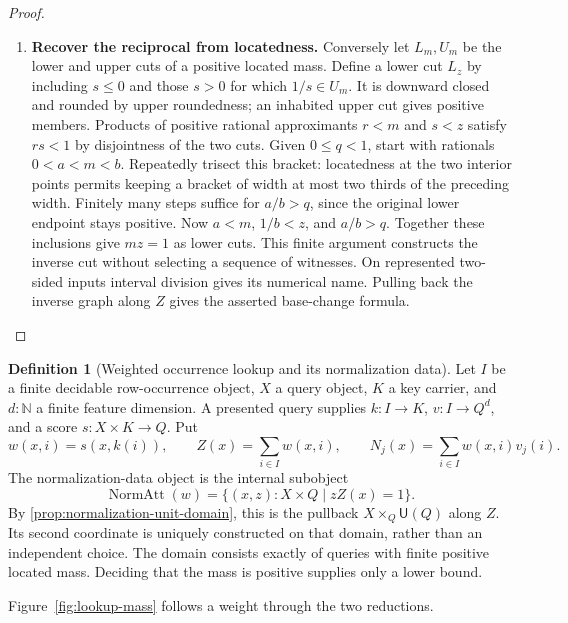 \documentclass[11pt,a4paper]{article}
\theoremstyle{definition}
\newtheorem{definition}[definition]{Definition}
\theoremstyle{remark}\newaliascnt{remark}{theorem}
\newcommand{\N}{\mathbb N}
\numberwithin{equation}{section}
\begin{document}
\begin{proof}
\begin{enumerate}[titledsteps]
    \item \textbf{Recover the reciprocal from locatedness.} Conversely let $L_m,U_m$ be the lower and upper cuts of a positive located mass. Define a lower cut $L_z$ by including $s\le0$ and those $s>0$ for which $1/s\in U_m$. It is downward closed and rounded by upper roundedness; an inhabited upper cut gives positive members. Products of positive rational approximants $r<m$ and $s<z$ satisfy $rs<1$ by disjointness of the two cuts. Given $0\le q<1$, start with rationals $0<a<m<b$. Repeatedly trisect this bracket: locatedness at the two interior points permits keeping a bracket of width at most two thirds of the preceding width. Finitely many steps suffice for $a/b>q$, since the original lower endpoint stays positive. Now $a<m$, $1/b<z$, and $a/b>q$. Together these inclusions give $mz=1$ as lower cuts. This finite argument constructs the inverse cut without selecting a sequence of witnesses. On represented two-sided inputs interval division gives its numerical name. Pulling back the inverse graph along $Z$ gives the asserted base-change formula.\qedhere
\end{enumerate}
\end{proof}
\begin{definition}[Weighted occurrence lookup and its normalization data]
\label{def:quant-attention}
Let $I$ be a finite decidable row-occurrence object, $X$ a query object,
$K$ a key carrier, and $d:\N$ a finite feature dimension. A presented
query supplies $k:I\to K$, $v:I\to Q^d$, and a score
$s:X\times K\to Q$. Put
\begin{equation}\label{eq:attention-raw}
 w(x,i)=s(x,k(i)),\qquad Z(x)=\sum_{i\in I}w(x,i),\qquad
 N_j(x)=\sum_{i\in I}w(x,i)v_j(i).
\end{equation}
The normalization-data object is the internal subobject
\begin{equation}\label{eq:attention-domain}
 \operatorname{NormAtt}(w)=
 \{(x,z):X\times Q\mid zZ(x)=1\}.
\end{equation}
By \cref{prop:normalization-unit-domain}, this is the pullback
$X\times_Q\mathsf{U}(Q)$ along $Z$. Its second coordinate is
uniquely constructed on that domain, rather than an independent
choice. The domain consists exactly of queries with finite positive
located mass. Deciding that the mass is positive supplies only a lower bound.
\end{definition}
Figure~\ref{fig:lookup-mass} follows a weight through the two reductions.
\end{document}
